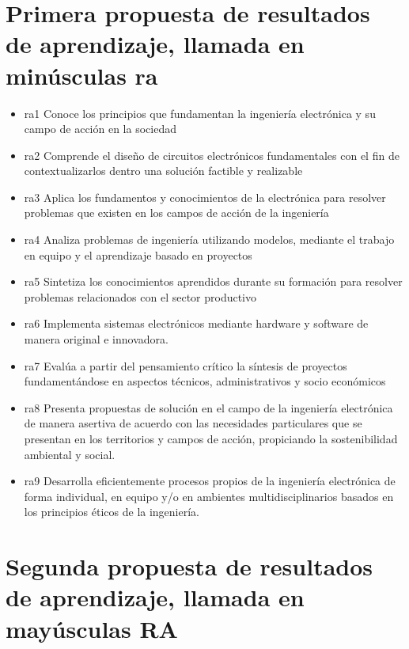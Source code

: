 \documentclass{article}
\begin{document}
\section{Primera propuesta de  resultados de aprendizaje, llamada en minúsculas \textbf{ra}}
\begin{itemize}
 \item ra1	Conoce los principios que fundamentan la ingeniería electrónica y su campo de acción en la sociedad
 \item ra2	Comprende el diseño de circuitos electrónicos fundamentales con el fin de contextualizarlos dentro una solución factible y realizable
 \item ra3	Aplica los fundamentos y conocimientos de la electrónica para resolver problemas que existen en los campos de acción de la ingeniería
 \item ra4	Analiza problemas de ingeniería utilizando modelos, mediante el trabajo en equipo y el aprendizaje basado en proyectos
 \item ra5	Sintetiza los conocimientos aprendidos durante su formación para resolver problemas relacionados con el sector productivo
 \item ra6	Implementa sistemas electrónicos mediante hardware y software de manera original e innovadora.
 \item ra7	Evalúa a partir del pensamiento crítico la síntesis de proyectos fundamentándose en aspectos técnicos, administrativos y socio económicos
 \item ra8	Presenta propuestas de solución en el campo de la ingeniería electrónica de manera asertiva  de acuerdo con las necesidades particulares que se presentan en los territorios y campos de acción, propiciando la sostenibilidad ambiental y social.
 \item ra9	Desarrolla eficientemente procesos propios de la ingeniería electrónica de forma individual, en equipo y/o en ambientes multidisciplinarios basados en los principios éticos de la ingeniería.

\end{itemize}



\section{Segunda propuesta de  resultados de aprendizaje, llamada en mayúsculas \textbf{RA}}
\end{document}
